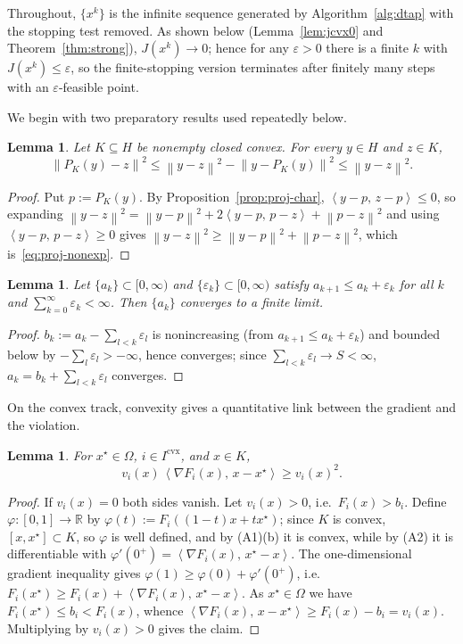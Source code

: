 \documentclass[]{interact}
\theoremstyle{plain}
\newtheorem{lemma}[theorem]{Lemma}
\theoremstyle{definition}
\theoremstyle{remark}
\newcommand{\R}{\mathbb{R}}
\newcommand{\norm}[1]{\left\lVert #1 \right\rVert}
\newcommand{\inner}[2]{\left\langle #1,\, #2 \right\rangle}
\newcommand{\cvx}{\mathrm{cvx}}
\begin{document}
Throughout, $\{x^k\}$ is the infinite sequence generated by Algorithm~\ref{alg:dtap} with
the stopping test removed. As shown below
(Lemma~\ref{lem:jcvx0} and Theorem~\ref{thm:strong}), $J(x^k)\to 0$; hence for any
$\varepsilon>0$ there is a finite $k$ with $J(x^k)\le\varepsilon$, so the finite-stopping
version terminates after finitely many steps with an $\varepsilon$-feasible point.

We begin with two preparatory results used repeatedly below.

\begin{lemma}\label{lem:proj-nonexp}
Let $K\subseteq H$ be nonempty closed convex. For every $y\in H$ and $z\in K$,
\begin{equation}\label{eq:proj-nonexp}
\norm{P_K(y)-z}^2\le\norm{y-z}^2-\norm{y-P_K(y)}^2\le\norm{y-z}^2 .
\end{equation}
\end{lemma}
\begin{proof}
Put $p:=P_K(y)$. By Proposition~\ref{prop:proj-char}, $\inner{y-p}{z-p}\le0$, so expanding
$\norm{y-z}^2=\norm{y-p}^2+2\inner{y-p}{p-z}+\norm{p-z}^2$ and using $\inner{y-p}{p-z}\ge0$
gives $\norm{y-z}^2\ge\norm{y-p}^2+\norm{p-z}^2$, which is~\eqref{eq:proj-nonexp}.
\end{proof}

\begin{lemma}\label{lem:seq}
Let $\{a_k\}\subset[0,\infty)$ and $\{\varepsilon_k\}\subset[0,\infty)$ satisfy
$a_{k+1}\le a_k+\varepsilon_k$ for all $k$ and $\sum_{k=0}^\infty\varepsilon_k<\infty$.
Then $\{a_k\}$ converges to a finite limit.
\end{lemma}
\begin{proof}
$b_k:=a_k-\sum_{l<k}\varepsilon_l$ is nonincreasing (from $a_{k+1}\le a_k+\varepsilon_k$) and
bounded below by $-\sum_l\varepsilon_l>-\infty$, hence converges; since
$\sum_{l<k}\varepsilon_l\to S<\infty$, $a_k=b_k+\sum_{l<k}\varepsilon_l$ converges.
\end{proof}

On the convex track, convexity gives a quantitative link between the gradient and the
violation.

\begin{lemma}\label{lem:grad-cvx}
For $x^\star\in\Omega$, $i\in I^{\cvx}$, and $x\in K$,
\[
v_i(x)\,\inner{\nabla F_i(x)}{x-x^\star}\ge v_i(x)^2 .
\]
\end{lemma}
\begin{proof}
If $v_i(x)=0$ both sides vanish. Let $v_i(x)>0$, i.e.\ $F_i(x)>b_i$. Define
$\varphi:[0,1]\to\R$ by $\varphi(t):=F_i((1-t)x+tx^\star)$; since $K$ is convex,
$[x,x^\star]\subset K$, so $\varphi$ is well defined, and by (A1)(b) it is convex, while
by (A2) it is differentiable with $\varphi'(0^+)=\inner{\nabla F_i(x)}{x^\star-x}$. The
one-dimensional gradient inequality gives $\varphi(1)\ge\varphi(0)+\varphi'(0^+)$, i.e.
$F_i(x^\star)\ge F_i(x)+\inner{\nabla F_i(x)}{x^\star-x}$. As $x^\star\in\Omega$ we have
$F_i(x^\star)\le b_i<F_i(x)$, whence
$\inner{\nabla F_i(x)}{x-x^\star}\ge F_i(x)-b_i=v_i(x)$. Multiplying by $v_i(x)>0$ gives
the claim.
\end{proof}
\end{document}

